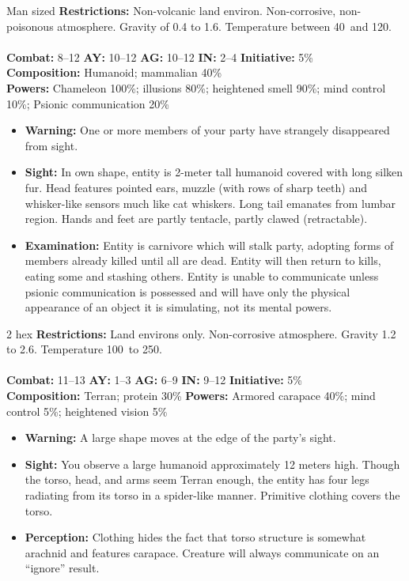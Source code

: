 \hrulefill

\begin{creature}{Man sized}
\textbf{Restrictions:} Non-volcanic land environ. Non-corrosive, non-poisonous atmosphere. Gravity of 0.4 to 1.6. Temperature between 40\textdegree\ 
and 120\textdegree. \\\\
\textbf{Combat:} 8--12 \textbf{AY:} 10--12 \textbf{AG:} 10--12 \textbf{IN:} 2--4 \textbf{Initiative:} 5\% \\
\textbf{Composition:} Humanoid; mammalian 40\% \\
\textbf{Powers:} Chameleon 100\%; illusions 80\%; heightened smell 90\%; mind control 10\%; Psionic communication 20\% 
\begin{itemize}
\item \textbf{Warning:} One or more members of your party have strangely disappeared from sight. 
\item \textbf{Sight:} In own shape, entity is 2-meter tall humanoid covered with long silken fur. Head features pointed ears, muzzle (with rows of 
sharp teeth) and whisker-like sensors much like cat whiskers. Long tail emanates from lumbar region. Hands and feet are partly 
tentacle, partly clawed (retractable). 
\item \textbf{Examination:} Entity is carnivore which will stalk party, adopting forms of members already killed until all are dead. Entity will then 
return to kills, eating some and stashing others. Entity is unable to communicate unless psionic communication is possessed and will 
have only the physical appearance of an object it is simulating, not its mental powers. 
\end{itemize}
\end{creature}

\hrulefill

\begin{creature}{2 hex}
\textbf{Restrictions:} Land environs only. Non-corrosive atmosphere. Gravity 1.2 to 2.6. Temperature 100\textdegree\ to 250\textdegree. \\\\
\textbf{Combat:} 11--13 \textbf{AY:} 1--3 \textbf{AG:} 6--9 \textbf{IN:} 9--12 \textbf{Initiative:} 5\% \\
\textbf{Composition:} Terran; protein 30\% \textbf{Powers:} Armored carapace 40\%; mind control 5\%; heightened vision 5\% 
\begin{itemize}
\item \textbf{Warning:} A large shape moves at the edge of the party's sight. 
\item \textbf{Sight:} You observe a large humanoid approximately 12 meters high. Though the torso, head, and arms seem Terran enough, the 
entity has four legs radiating from its torso in a spider-like manner. Primitive clothing covers the torso. 
\item \textbf{Perception:} Clothing hides the fact that torso structure is somewhat arachnid and features carapace. 
Creature will always communicate on an ``ignore'' result. 
\end{itemize}
\end{creature}

